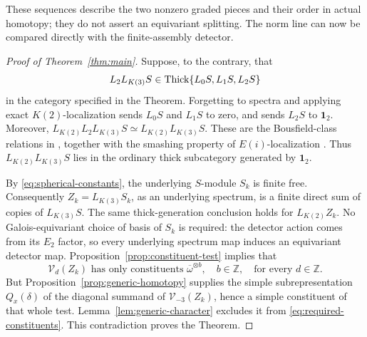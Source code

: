 These sequences describe the two nonzero graded pieces and their order
in actual homotopy; they do not assert an equivariant splitting. The
norm line can now be compared directly with the finite-assembly detector.

\begin{proof}[Proof of Theorem~\ref{thm:main}]
Suppose, to the contrary, that
\[
          L_2L_{K(3)}S\in\operatorname{Thick}\{L_0S,L_1S,L_2S\}
\]
in the category specified in the Theorem. Forgetting to spectra and
applying exact \(K(2)\)-localization sends \(L_0S\) and \(L_1S\) to zero,
and sends \(L_2S\) to \(\mathbf 1_2\). Moreover,
\(L_{K(2)}L_2L_{K(3)}S\simeq L_{K(2)}L_{K(3)}S\). These are the
Bousfield-class relations in \citet[Theorem~2.1(d),(i)]{Ravenel84}, together
with the smashing property of \(E(i)\)-localization
\citep[Theorem~5.1 and Proposition~5.3]{HS99}. Thus
\(L_{K(2)}L_{K(3)}S\) lies in the ordinary thick subcategory generated by
\(\mathbf 1_2\).

By \eqref{eq:spherical-constants}, the underlying \(S\)-module \(S_k\) is
finite free. Consequently \(Z_k=L_{K(3)}S_k\), as an underlying spectrum,
is a finite direct sum of copies of \(L_{K(3)}S\). The same thick-generation
conclusion holds for \(L_{K(2)}Z_k\). No Galois-equivariant choice of basis
of \(S_k\) is required: the detector action comes from its \(E_2\) factor,
so every underlying spectrum map induces an equivariant detector map.
Proposition~\ref{prop:constituent-test} implies that
\begin{equation}\label{eq:required-constituents}
 \mathcal V_d(Z_k)\text{ has only constituents }
       \overline\omega^{\otimes b},\quad b\in\mathbb Z,
       \quad\text{for every }d\in\mathbb Z.
\end{equation}
But Proposition~\ref{prop:generic-homotopy} supplies the simple
subrepresentation \(Q_x(\delta)\) of the diagonal summand of
\(\mathcal V_{-3}(Z_k)\), hence a simple constituent of that whole test.
Lemma~\ref{lem:generic-character} excludes it from
\eqref{eq:required-constituents}. This contradiction proves the Theorem.
\end{proof}

